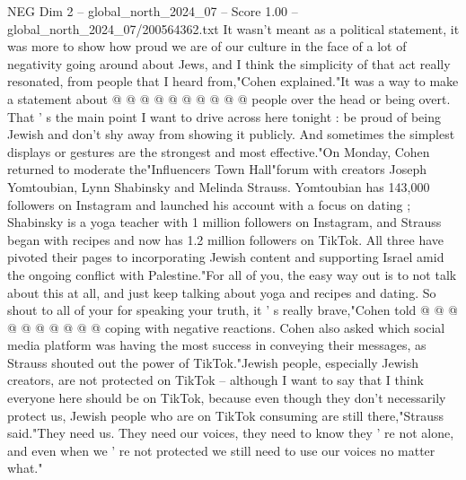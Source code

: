 \begin{textsample}{NEG Dim 2 – global\_north\_2024\_07 – Score 1.00 – global\_north\_2024\_07/200564362.txt}
It wasn't meant as a political statement, it was more to show how proud we are of our culture in the face of a lot of negativity going around about Jews, and I think the simplicity of that act really resonated, from people that I heard from,"Cohen explained."It was a way to make a statement about @ @ @ @ @ @ @ @ @ @ people over the head or being overt.
That ' s the main point I want to drive across here tonight : be proud of being Jewish and don't shy away from showing it publicly.
And sometimes the simplest displays or gestures are the strongest and most effective."On Monday, Cohen returned to moderate the"Influencers Town Hall"forum with creators Joseph Yomtoubian, Lynn Shabinsky and Melinda Strauss.
Yomtoubian has 143,000 followers on Instagram and launched his account with a focus on dating ; Shabinsky is a yoga teacher with 1 million followers on Instagram, and Strauss began with recipes and now has 1.2 million followers on TikTok.
All three have pivoted their pages to incorporating Jewish content and supporting Israel amid the ongoing conflict with Palestine."For all of you, the easy way out is to not talk about this at all, and just keep talking about yoga and recipes and dating.
So shout to all of your for speaking your truth, it ' s really brave,"Cohen told @ @ @ @ @ @ @ @ @ @ coping with negative reactions.
Cohen also asked which social media platform was having the most success in conveying their messages, as Strauss shouted out the power of TikTok."Jewish people, especially Jewish creators, are not protected on TikTok -- although I want to say that I think everyone here should be on TikTok, because even though they don't necessarily protect us, Jewish people who are on TikTok consuming are still there,"Strauss said."They need us.
They need our voices, they need to know they ' re not alone, and even when we ' re not protected we still need to use our voices no matter what."

\end{textsample}
